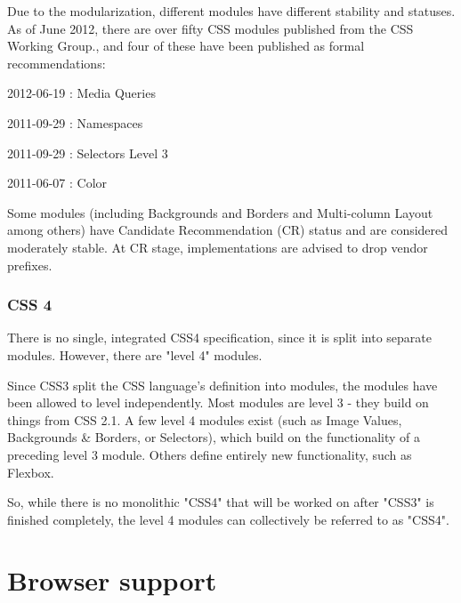 Due to the modularization, different modules have different stability and statuses. As of June 2012, there are over fifty CSS modules published from the CSS Working Group., and four of these have been published as formal recommendations:

\begin{compactitem}
\item 2012-06-19 : Media Queries
\item 2011-09-29 : Namespaces
\item 2011-09-29 : Selectors Level 3
\item 2011-06-07 : Color
\end{compactitem}

Some modules (including Backgrounds and Borders and Multi-column Layout among others) have Candidate Recommendation (CR) status and are considered moderately stable. At CR stage, implementations are advised to drop vendor prefixes.



\subsection{CSS 4}

There is no single, integrated CSS4 specification, since it is split into separate modules. However, there are "level 4" modules.

Since CSS3 split the CSS language's definition into modules, the modules have been allowed to level independently. Most modules are level 3 - they build on things from CSS 2.1. A few level 4 modules exist (such as Image Values, Backgrounds \& Borders, or Selectors), which build on the functionality of a preceding level 3 module. Others define entirely new functionality, such as Flexbox.

So, while there is no monolithic "CSS4" that will be worked on after "CSS3" is finished completely, the level 4 modules can collectively be referred to as "CSS4".



\chapter{Browser support}

